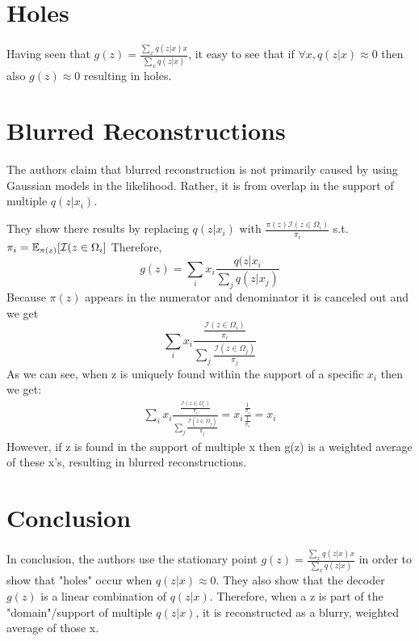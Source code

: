 \section*{Holes}
Having seen that $g(z) = \frac{\sum_{x}{q(z|x) x}}{\sum_{x}{q(z|x)}}$, it easy to see that if $\forall x, q(z|x) \approx 0$ then also $g(z) \approx 0$ resulting in holes.

\section*{Blurred Reconstructions}
The authors claim that blurred reconstruction is not primarily caused by using Gaussian models in the likelihood. Rather, it is from overlap in the support of multiple $q(z|x_{i})$.
\par
They show there results by replacing $q(z|x_{i})$ with $\frac{\pi(z)\mathcal{I}(z\in\Omega_{i})}{\pi_{i}}$ s.t. $\pi_{i} = \operatorname{\mathbb{E}}_{\pi(z)}[\mathcal{I}(z\in\Omega_{i}]$
Therefore,
\setcounter{equation}{0} 
\begin{equation}
g(z) = \sum_{i}x_{i}\frac{q(z|x_{i}}{\sum_{j}q(z|x_{j})}
\end{equation}
Because $\pi(z)$ appears in the numerator and denominator it is canceled out and we get
\begin{equation}
\sum_{i}x_{i}\frac{\frac{\mathcal{I}(z\in\Omega_{i})}{\pi_{i}}}{\sum_{j}\frac{\mathcal{I}(z\in\Omega_{j})}{\pi_{j}}}
\end{equation}
As we can see, when z is uniquely found within the support of a specific $x_i$ then we get:
\begin{gather*}
\sum_{i}x_{i}\frac{\frac{\mathcal{I}(z\in\Omega_{i})}{\pi_{i}}}{\sum_{j}\frac{\mathcal{I}(z\in\Omega_{j})}{\pi_{j}}} = x_{i}\frac{\frac{1}{\pi_{i}}}{\frac{1}{\pi_{i}}} = x_{i}
\end{gather*}
However, if z is found in the support of multiple x then g(z) is a weighted average of these x's, resulting in blurred reconstructions.

\section*{Conclusion}
In conclusion, the authors use the stationary point $g(z) = \frac{\sum_{x}{q(z|x) x}}{\sum_{x}{q(z|x)}}$ in order to show that "holes" occur when $q(z|x) \approx 0$. They also show that the decoder $g(z)$ is a linear combination of $q(z|x)$. Therefore, when a z is part of the "domain"/support of multiple $q(z|x)$, it is reconstructed as a blurry, weighted average of those x.
